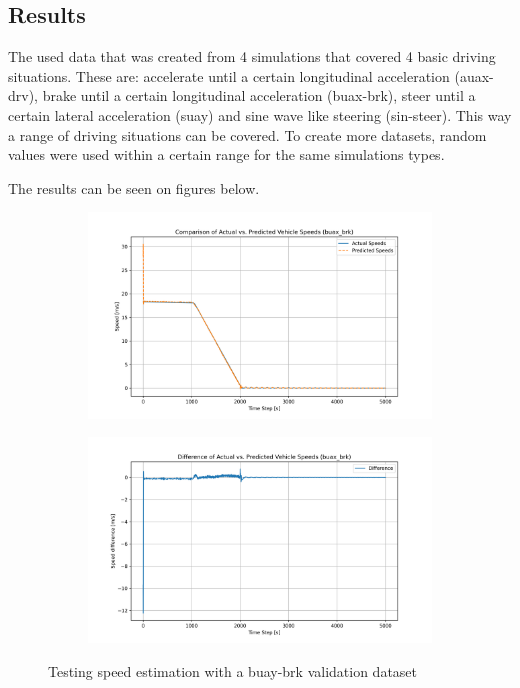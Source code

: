 \subsection{Results}

The used data that was created from 4 simulations that covered 4 basic driving situations. These are: accelerate until a certain longitudinal acceleration (auax-drv), brake until a certain longitudinal acceleration (buax-brk), steer until a certain lateral acceleration (suay) and sine wave like steering (sin-steer). This way a range of driving situations can be covered. To create more datasets, random values were used within a certain range for the same simulations types. 

The results can be seen on figures below.
\FloatBarrier
\begin{figure}[htbp]
    \centering

    \begin{subfigure}{1\textwidth}
        \centering
        \includegraphics[width=\linewidth]{images/RNN_results/model_0_buax_brk_act_vs_predicted_speed.png}
    \end{subfigure}
    \hfill
    \begin{subfigure}{1\textwidth}
        \centering
        \includegraphics[width=\linewidth]{images/RNN_results/model_0_buax_brk_act_vs_predicted_speed_diff.png}
    \end{subfigure}
    
    \caption{Testing speed estimation with a buay-brk validation dataset}
    \label{fig:rnn_results_buax_brk}
\end{figure}


